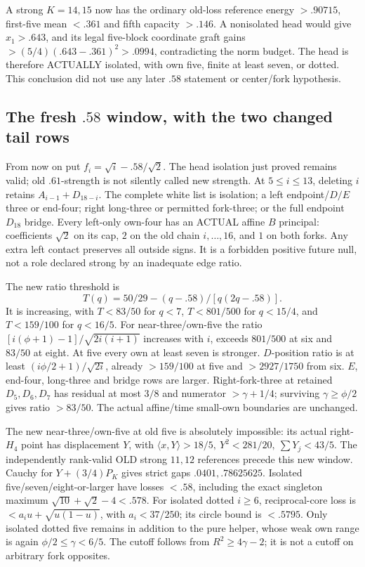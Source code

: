 \documentclass[11pt]{article}
\theoremstyle{definition}
\theoremstyle{remark}
\newcommand{\ip}[2]{\langle #1,#2\rangle}
\begin{document}
A strong \(K=14,15\) now has the ordinary old-loss reference
energy \(>.90715\), first-five mean \(<.361\) and
fifth capacity \(>.146\).
A nonisolated head would give \(x_1>.643\), and its legal five-block
coordinate graft gains \(>(5/4)(.643-.361)^2>.0994\),
contradicting the norm budget.
The head is therefore ACTUALLY isolated, with own five,
finite at least seven, or dotted. This conclusion did not use any
later \(.58\) statement or center/fork hypothesis.

\subsection[The fresh .58 window, with the two changed tail rows]{The fresh \(.58\) window, with the two changed tail rows}
\label{app:D18freshwindow}
From now on put \(f_i=\sqrt i-.58/\sqrt2\).
The head isolation just proved remains valid; old \(.61\)-strength
is not silently called new strength.
At \(5\leq i\leq13\), deleting \(i\) retains
\(A_{i-1}+D_{18-i}\).
The complete white list is isolation; a left endpoint/\(D/E\)
three or end-four; right long-three or permitted fork-three;
or the full endpoint \(D_{18}\) bridge.
Every left-only own-four has an ACTUAL affine \(B\) principal:
coefficients \(\sqrt2\) on its cap, \(2\) on the old chain
\(i,\ldots,16\), and \(1\) on both forks.
Any extra left contact preserves all outside signs.
It is a forbidden positive future null, not a role declared strong
by an inadequate edge ratio.

The new ratio threshold is
\[
 T(q)=50/29-(q-.58)/[q(2q-.58)].
\]
It is increasing, with \(T<83/50\) for \(q<7\),
\(T<801/500\) for \(q<15/4\), and \(T<159/100\) for \(q<16/5\).
For near-three/own-five the ratio
\([i(\phi+1)-1]/\sqrt{2i(i+1)}\) increases with \(i\),
exceeds \(801/500\) at six and \(83/50\) at eight.
At five every own at least seven is stronger.
\(D\)-position ratio is at least \((i\phi/2+1)/\sqrt{2i}\),
already \(>159/100\) at five and \(>2927/1750\) from six.
\(E\), end-four, long-three and bridge rows are larger.
Right-fork-three at retained \(D_5,D_6,D_7\) has residual
at most \(3/8\) and numerator \(>\gamma+1/4\);
surviving \(\gamma\geq\phi/2\) gives ratio \(>83/50\).
The actual affine/time small-own boundaries are unchanged.

The new near-three/own-five at old five is absolutely impossible:
its actual right-\(H_4\) point has displacement \(Y\), with
\(\ip xY>18/5,\ Y^2<281/20,\ \sum Y_j<43/5\).
The independently rank-valid OLD strong \(11,12\) references
precede this new window.
Cauchy for \(Y+(3/4)P_K\) gives strict gaps
\(.0401,.78625625\).
Isolated five/seven/eight-or-larger have losses \(<.58\),
including the exact singleton maximum
\(\sqrt{10}+\sqrt2-4<.578\).
For isolated dotted \(i\geq6\), reciprocal-core loss is
\(<a_iu+\sqrt{u(1-u)}\), with \(a_i<37/250\);
its circle bound is \(<.5795\).
Only isolated dotted five remains in addition to the pure helper,
whose weak own range is again \(\phi/2\leq\gamma<6/5\).
The cutoff follows from \(R^2\geq4\gamma-2\);
it is not a cutoff on arbitrary fork opposites.
\end{document}
